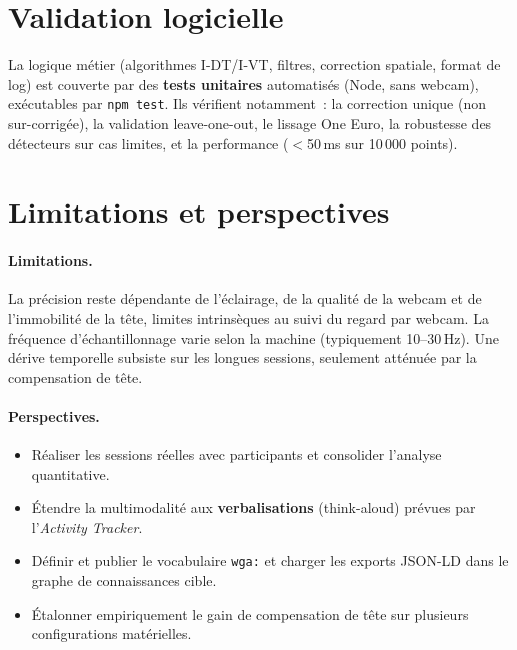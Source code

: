 \documentclass[11pt,a4paper]{article}
\newcommand{\code}[1]{\texttt{\small #1}}
\begin{document}
\section{Validation logicielle}

La logique métier (algorithmes I-DT/I-VT, filtres, correction spatiale, format de
log) est couverte par des \textbf{tests unitaires} automatisés (Node, sans webcam),
exécutables par \code{npm test}. Ils vérifient notamment~: la correction unique
(non sur-corrigée), la validation leave-one-out, le lissage One Euro, la robustesse
des détecteurs sur cas limites, et la performance ($<$50\,ms sur 10\,000 points).

\section{Limitations et perspectives}

\paragraph{Limitations.} La précision reste dépendante de l'éclairage, de la qualité
de la webcam et de l'immobilité de la tête, limites intrinsèques au suivi du
regard par webcam. La fréquence d'échantillonnage varie selon la machine
(typiquement 10--30\,Hz). Une dérive temporelle subsiste sur les longues sessions,
seulement atténuée par la compensation de tête.

\paragraph{Perspectives.}
\begin{itemize}[leftmargin=1.4em]
  \item Réaliser les sessions réelles avec participants et consolider l'analyse quantitative.
  \item Étendre la multimodalité aux \textbf{verbalisations} (think-aloud) prévues
  par l'\textit{Activity Tracker}.
  \item Définir et publier le vocabulaire \code{wga:} et charger les exports JSON-LD
  dans le graphe de connaissances cible.
  \item Étalonner empiriquement le gain de compensation de tête sur plusieurs
  configurations matérielles.
\end{itemize}

\end{document}
